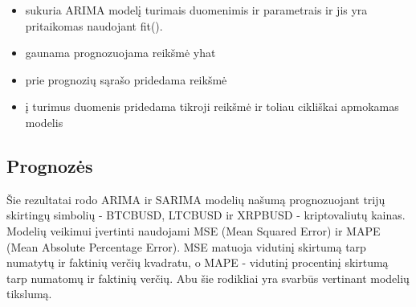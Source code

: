 \documentclass{VUMIFInfKursinis}
\begin{document}
\begin{itemize}
  \item sukuria ARIMA modelį turimais duomenimis ir parametrais ir jis yra pritaikomas naudojant fit().
  \item gaunama prognozuojama reikšmė yhat
  \item prie prognozių sąrašo pridedama reikšmė
  \item į turimus duomenis pridedama tikroji reikšmė ir toliau cikliškai apmokamas modelis
\end{itemize}

\subsection{Prognozės}

Šie rezultatai rodo ARIMA ir SARIMA modelių našumą prognozuojant trijų skirtingų simbolių - BTCBUSD, LTCBUSD ir XRPBUSD - kriptovaliutų kainas.
Modelių veikimui įvertinti naudojami MSE (Mean Squared Error) ir MAPE (Mean Absolute Percentage Error). 
MSE matuoja vidutinį skirtumą tarp numatytų ir faktinių verčių kvadratu, o MAPE - vidutinį procentinį skirtumą tarp numatomų ir faktinių verčių. 
Abu šie rodikliai yra svarbūs vertinant modelių tikslumą.
\end{document}
